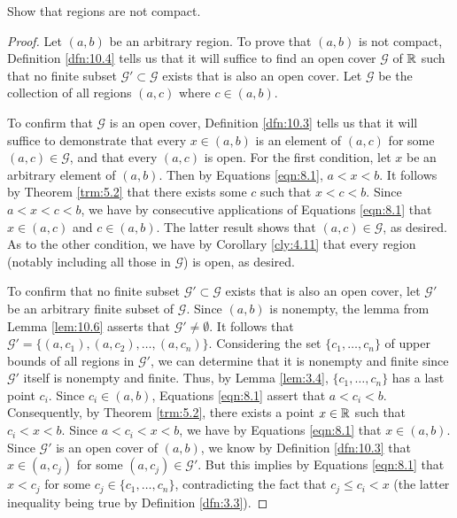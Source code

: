\documentclass[../main.tex]{subfiles}
\begin{document}
\begin{exercise}\label{exr:10.8}
    Show that regions are not compact.
    \begin{proof}
        Let $(a,b)$ be an arbitrary region. To prove that $(a,b)$ is not compact, Definition \ref{dfn:10.4} tells us that it will suffice to find an open cover $\mathcal{G}$ of $\mathbb{R}$ such that no finite subset $\mathcal{G}'\subset\mathcal{G}$ exists that is also an open cover. Let $\mathcal{G}$ be the collection of all regions $(a,c)$ where $c\in(a,b)$.\par
        To confirm that $\mathcal{G}$ is an open cover, Definition \ref{dfn:10.3} tells us that it will suffice to demonstrate that every $x\in(a,b)$ is an element of $(a,c)$ for some $(a,c)\in\mathcal{G}$, and that every $(a,c)$ is open. For the first condition, let $x$ be an arbitrary element of $(a,b)$. Then by Equations \ref{eqn:8.1}, $a<x<b$. It follows by Theorem \ref{trm:5.2} that there exists some $c$ such that $x<c<b$. Since $a<x<c<b$, we have by consecutive applications of Equations \ref{eqn:8.1} that $x\in(a,c)$ and $c\in(a,b)$. The latter result shows that $(a,c)\in\mathcal{G}$, as desired. As to the other condition, we have by Corollary \ref{cly:4.11} that every region (notably including all those in $\mathcal{G}$) is open, as desired.\par
        To confirm that no finite subset $\mathcal{G}'\subset\mathcal{G}$ exists that is also an open cover, let $\mathcal{G}'$ be an arbitrary finite subset of $\mathcal{G}$. Since $(a,b)$ is nonempty, the lemma from Lemma \ref{lem:10.6} asserts that $\mathcal{G}'\neq\emptyset$. It follows that $\mathcal{G}'=\{(a,c_1),(a,c_2),\dots,(a,c_n)\}$. Considering the set $\{c_1,\dots,c_n\}$ of upper bounds of all regions in $\mathcal{G}'$, we can determine that it is nonempty and finite since $\mathcal{G}'$ itself is nonempty and finite. Thus, by Lemma \ref{lem:3.4}, $\{c_1,\dots,c_n\}$ has a last point $c_i$. Since $c_i\in(a,b)$, Equations \ref{eqn:8.1} assert that $a<c_i<b$. Consequently, by Theorem \ref{trm:5.2}, there exists a point $x\in\mathbb{R}$ such that $c_i<x<b$. Since $a<c_i<x<b$, we have by Equations \ref{eqn:8.1} that $x\in(a,b)$. Since $\mathcal{G}'$ is an open cover of $(a,b)$, we know by Definition \ref{dfn:10.3} that $x\in(a,c_j)$ for some $(a,c_j)\in\mathcal{G}'$. But this implies by Equations \ref{eqn:8.1} that $x<c_j$ for some $c_j\in\{c_1,\dots,c_n\}$, contradicting the fact that $c_j\leq c_i<x$ (the latter inequality being true by Definition \ref{dfn:3.3}).
    \end{proof}
\end{exercise}
\pagebreak
\end{document}
